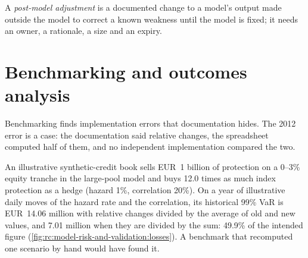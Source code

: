 \begin{definition}\label{def:rc:model-risk-and-validation:pma}
A \emph{post-model adjustment} is a documented change to a model's output
made outside the model to correct a known weakness until the model is fixed; it needs an owner, a
rationale, a size and an expiry.
\end{definition}

\section{Benchmarking and outcomes analysis}

Benchmarking finds implementation errors that documentation hides. The 2012 error is a case: the
documentation said relative changes, the spreadsheet computed half of them, and no independent
implementation compared the two.

\begin{example}\label{ex:rc:model-risk-and-validation:half}
An illustrative synthetic-credit book sells EUR~1 billion of protection on a 0--3\% equity tranche in the
large-pool model and buys 12.0 times as much index protection as a hedge (hazard 1\%, correlation 20\%).
On a year of illustrative daily moves of the hazard rate and the correlation, its historical 99\% VaR is
EUR~14.06 million with relative changes divided by the average of old and new values, and 7.01 million
when they are divided by the sum: 49.9\% of the intended figure
(\cref{fig:rc:model-risk-and-validation:losses}). A benchmark that recomputed one scenario by hand
would have found it.
\end{example}

\begin{omfigure}

\label{fig:rc:model-risk-and-validation:losses}
\end{omfigure}

